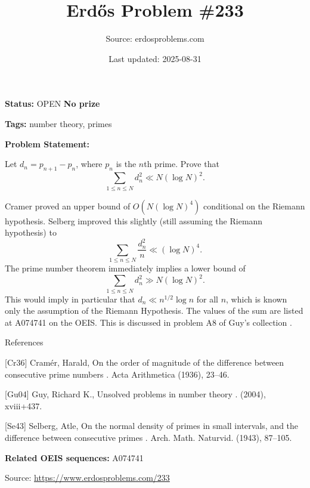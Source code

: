 \documentclass{article}
\title{Erd\H{o}s Problem \#233}
\date{Last updated: 2025-08-31}
\author{Source: erdosproblems.com}
\begin{document}
\maketitle

\noindent\textbf{Status:} OPEN \quad \textbf{No prize}

\noindent\textbf{Tags:} number theory, primes

\medskip

\noindent\textbf{Problem Statement:}

Let $d_n=p_{n+1}-p_n$, where $p_n$ is the $n$th prime. Prove that\[\sum_{1\leq n\leq N}d_n^2 \ll N(\log N)^2.\]




Cramer \cite{Cr36} proved an upper bound of $O(N(\log N)^4)$ conditional on the Riemann hypothesis. Selberg \cite{Se43} improved this slightly (still assuming the Riemann hypothesis) to\[\sum_{1\leq n\leq N}\frac{d_n^2}{n}\ll (\log N)^4.\]The prime number theorem immediately implies a lower bound of\[\sum_{1\leq n\leq N}d_n^2\gg N(\log N)^2.\]This would imply in particular that $d_n\ll n^{1/2}\log n$ for all $n$, which is known only the assumption of the Riemann Hypothesis. The values of the sum are listed at A074741 on the OEIS. This is discussed in problem A8 of Guy's collection \cite{Gu04}.




References

[Cr36] Cram\'{e}r, Harald, On the order of magnitude of the difference between consecutive prime numbers . Acta Arithmetica (1936), 23--46.

[Gu04] Guy, Richard K., Unsolved problems in number theory . (2004), xviii+437.

[Se43] Selberg, Atle, On the normal density of primes in small intervals, and the difference between consecutive primes . Arch. Math. Naturvid. (1943), 87--105.

\noindent\textbf{Related OEIS sequences:} A074741


\bigskip
\noindent\small{Source: \url{https://www.erdosproblems.com/233}}
\end{document}
